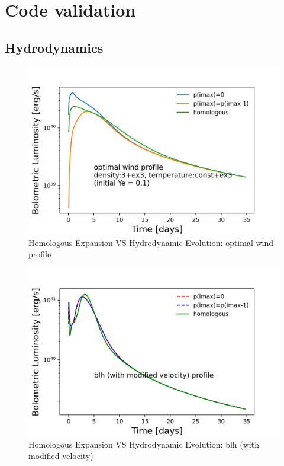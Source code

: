 \documentclass[fleqn,usenatbib]{mnras}
\begin{document}
\section{Code validation}



\subsection{Hydrodynamics}

\begin{figure}
\centering
\includegraphics[scale=0.5]{figures/CodeValidation-Hydrodynamics/LC_wind3ex3-Tex3_cb_zb_homologous.png}
\caption{Homologous Expansion VS Hydrodynamic Evolution: optimal wind profile}
\label{CodeValidation-Hydro_wind3ex3-Tex3}
\end{figure} 

\begin{figure}
\centering
\includegraphics[scale=0.5]{figures/CodeValidation-Hydrodynamics/LC_blh-mvel_cb_zb_homologous.png}
\caption{Homologous Expansion VS Hydrodynamic Evolution: blh (with modified velocity)}
\label{CodeValidation-Hydro_blh-mvel}
\end{figure} 
\end{document}
